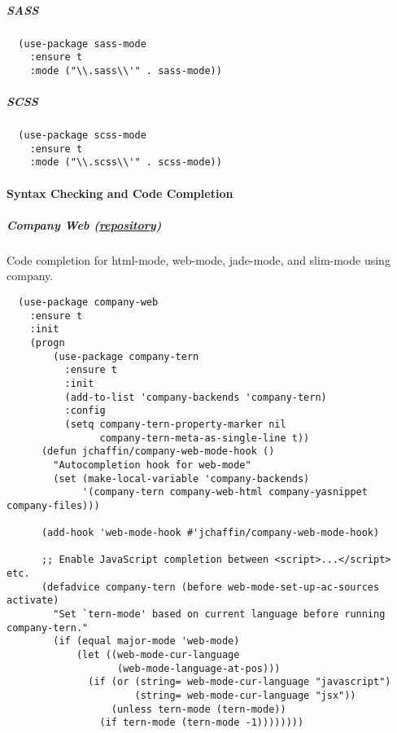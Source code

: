 \documentclass[11pt]{article}
\begin{document}
\subparagraph*{SASS}
\label{sec:org77f2874}

\begin{verbatim}
  (use-package sass-mode
    :ensure t
    :mode ("\\.sass\\'" . sass-mode))
\end{verbatim}

\subparagraph*{SCSS}
\label{sec:org2a609c6}

\begin{verbatim}
  (use-package scss-mode
    :ensure t
    :mode ("\\.scss\\'" . scss-mode))
\end{verbatim}

\paragraph*{Syntax Checking and Code Completion}
\label{sec:org9bbd284}
\subparagraph*{Company Web (\href{https://github.com/osv/company-web}{repository})}
\label{sec:org4d68ca5}

Code completion for html-mode, web-mode, jade-mode,
and slim-mode using company.

\begin{verbatim}
  (use-package company-web
    :ensure t
    :init
    (progn
        (use-package company-tern
          :ensure t
          :init
          (add-to-list 'company-backends 'company-tern)
          :config
          (setq company-tern-property-marker nil
                company-tern-meta-as-single-line t))
      (defun jchaffin/company-web-mode-hook ()
        "Autocompletion hook for web-mode"
        (set (make-local-variable 'company-backends)
             '(company-tern company-web-html company-yasnippet company-files)))

      (add-hook 'web-mode-hook #'jchaffin/company-web-mode-hook)

      ;; Enable JavaScript completion between <script>...</script> etc.
      (defadvice company-tern (before web-mode-set-up-ac-sources activate)
        "Set `tern-mode' based on current language before running company-tern."
        (if (equal major-mode 'web-mode)
            (let ((web-mode-cur-language
                   (web-mode-language-at-pos)))
              (if (or (string= web-mode-cur-language "javascript")
                      (string= web-mode-cur-language "jsx"))
                  (unless tern-mode (tern-mode))
                (if tern-mode (tern-mode -1))))))))
\end{verbatim}
\end{document}
